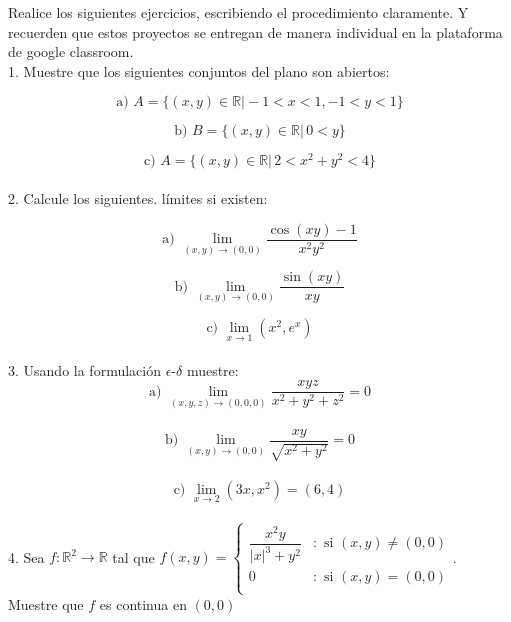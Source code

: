 \documentclass[letterpaper]{article}
\renewcommand{\*}{\cdot}
\theoremstyle{definition}
\begin{document}
\noindent Realice los siguientes ejercicios, escribiendo el procedimiento claramente. Y recuerden que estos proyectos se entregan de manera individual en la plataforma de google classroom. \\[0.5cm]
1.  Muestre que los siguientes conjuntos del plano son abiertos: 


$$\text{a) } A = \{ (x,y) \in \mathbb{R} \vert - 1 < x < 1, - 1 < y < 1 \}$$

$$\text{b) }B = \{ (x,y) \in \mathbb{R} \vert \,  0 < y  \}$$

$$\text{c) }A = \{ (x,y) \in \mathbb{R} \vert \, 2 < x^2  + y^2 <  4 \}$$\\[0.5cm]
2.  Calcule los siguientes. límites si existen: 


$$\text{a) }\displaystyle\lim_{(x,y) \to (0,0)} \dfrac{\cos(xy) - 1}{x^2y^2}$$

$$\text{b) }\displaystyle\lim_{(x,y) \to (0,0)} \dfrac{\sin(xy) }{xy}$$

$$\text{c) }\displaystyle\lim_{x \to 1} (x^2 , e^x) $$\\[0.5cm]
3.  Usando la formulación $\epsilon$-$\delta$ muestre: \\

 $$ \text{a) } \displaystyle\lim_{(x,y,z) \to (0,0,0)} \dfrac{xyz}{x^2 + y^2 + z^2} = 0$$\\

$$\text{b) }\displaystyle\lim_{(x,y) \to (0,0)} \dfrac{xy }{\sqrt{x^2 + y^2}} = 0$$\\

$$\text{c) }\displaystyle\lim_{x \to 2} (3x , x^2) = (6,4) $$\\[0.5cm]
4.  Sea $f: \mathbb{R}^2  \longrightarrow \mathbb{R}$ tal que $f(x,y) = \left\{
     \begin{array}{cl}
       \dfrac{x^2y}{\vert x \vert^3 + y^2} & : \text{ si } (x,y) \neq (0,0)\\
       0 & : \text{ si } (x,y) = (0,0)\\
     \end{array}
   \right.$. \\Muestre que $f$ es continua en $(0,0)$
\end{document}
